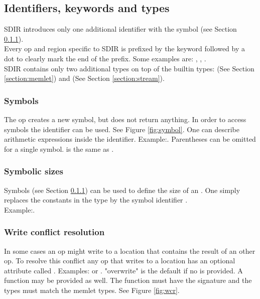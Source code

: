 \subsection{Identifiers, keywords and types}
SDIR introduces only one additional identifier with the symbol \codeword{\$} (see Section \ref{section:symbol}).\\
Every op and region specific to SDIR is prefixed by the keyword  followed by a dot to clearly mark the end of the prefix. Some examples are: , , . \\
SDIR contains only two additional types on top of the builtin types:  (See Section \ref{section:memlet}) and  (See Section \ref{section:stream}).

\subsubsection{Symbols} \label{section:symbol}
The op  creates a new symbol, but does not return anything. In order to access symbols the identifier \codeword{\$()} can be used. See Figure \ref{fig:symbol}. One can describe arithmetic expressions inside the identifier. Example:. Parentheses can be omitted for a single symbol.  is the same as .

 \subsubsection{Symbolic sizes}
 Symbols (see Section \ref{section:symbol}) can be used to define the size of an . One simply replaces the constants in the type by the symbol identifier \codeword{\$()}.\\
 Example:.
 
 \subsubsection{Write conflict resolution}
In some cases an op might write to a location that contains the result of an other op. To resolve this conflict any op that writes to a location has an optional attribute called . Examples: or . "overwrite" is the default if no  is provided. A function may be provided as well. The function must have the signature  and the types must match the memlet types. See Figure \ref{fig:wcr}.

